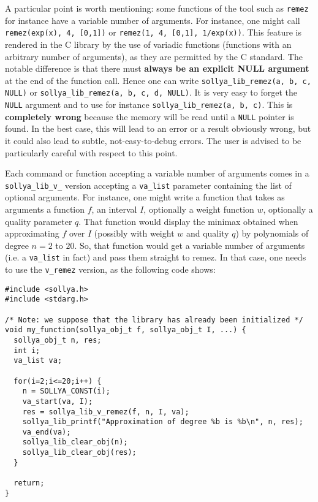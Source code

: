 \documentclass[a4paper]{article}
\begin{document}
A particular point is worth mentioning: some functions of the tool such as \texttt{remez} for instance have a variable number of arguments. For instance, one might call \texttt{remez(exp(x), 4, [0,1])} or \texttt{remez(1, 4, [0,1], 1/exp(x))}. This feature is rendered in the C library by the use of variadic functions (functions with an arbitrary number of arguments), as they are permitted by the C standard. The notable difference is that there must \textbf{always be an explicit NULL argument} at the end of the function call. Hence one can write \texttt{sollya\_lib\_remez(a, b, c, NULL)} or \texttt{sollya\_lib\_remez(a, b, c, d, NULL)}. It is very easy to forget the \texttt{NULL} argument and to use for instance \texttt{sollya\_lib\_remez(a, b, c)}. This is \textbf{completely wrong} because the memory will be read until a \texttt{NULL} pointer is found. In the best case, this will lead to an error or a result obviously wrong, but it could also lead to subtle, not-easy-to-debug errors. The user is advised to be particularly careful with respect to this point.

Each command or function accepting a variable number of arguments comes in a \texttt{sollya\_lib\_v\_} version accepting a \texttt{va\_list} parameter containing the list of optional arguments. For instance, one might write a function that takes as arguments a function $f$, an interval $I$, optionally a weight function $w$, optionally a quality parameter $q$. That function would display the minimax obtained when approximating $f$ over $I$ (possibly with weight $w$ and quality $q$) by polynomials of degree $n=2$ to $20$. So, that function would get a variable number of arguments (i.e. a \texttt{va\_list} in fact) and pass them straight to remez. In that case, one needs to use the \texttt{v\_remez} version, as the following code shows:

\begin{center}\begin{minipage}{15cm}\begin{Verbatim}[frame=single]
#include <sollya.h>
#include <stdarg.h>

/* Note: we suppose that the library has already been initialized */
void my_function(sollya_obj_t f, sollya_obj_t I, ...) {
  sollya_obj_t n, res;
  int i;
  va_list va;

  for(i=2;i<=20;i++) {
    n = SOLLYA_CONST(i);
    va_start(va, I);
    res = sollya_lib_v_remez(f, n, I, va);
    sollya_lib_printf("Approximation of degree %b is %b\n", n, res);
    va_end(va);
    sollya_lib_clear_obj(n);
    sollya_lib_clear_obj(res);
  }

  return;
}
\end{Verbatim}
\end{minipage}\end{center}
\end{document}
